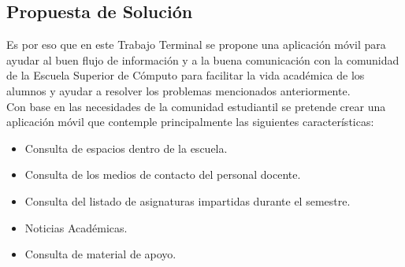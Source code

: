 	\subsection{Propuesta de Solución}
	
	Es por eso que en este Trabajo Terminal se propone una aplicación móvil para ayudar al buen flujo de información y a la buena comunicación con la comunidad de la Escuela Superior de Cómputo para facilitar la vida académica de los alumnos y ayudar a resolver los problemas mencionados anteriormente.\\
	
	Con base en las necesidades de la comunidad estudiantil se pretende crear una aplicación móvil que contemple principalmente las siguientes características:
	\begin{itemize}
		\item Consulta de espacios dentro de la escuela.
		\item Consulta de los medios de contacto del personal docente.
		\item Consulta del listado de asignaturas impartidas durante el semestre.
		\item Noticias Académicas.
		\item  Consulta de material de apoyo.
	\end{itemize}
